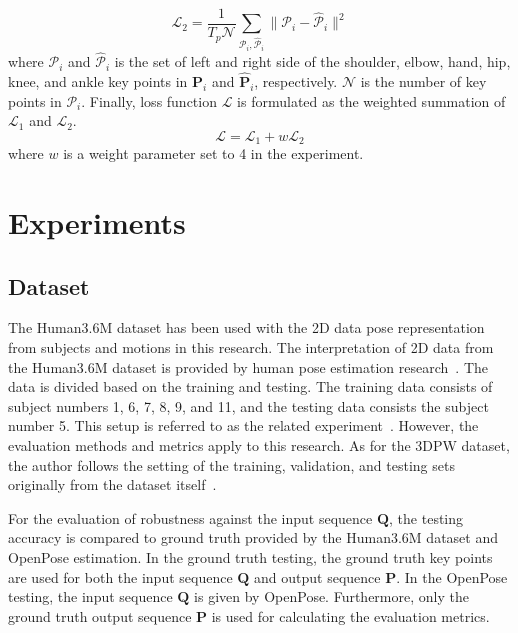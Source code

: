 \begin{equation}
    \label{eq:rmse_add}
    \mathcal{L}_2 =
            \frac{1}{T_p \mathcal{N}}
            \sum_{
                \mathcal{P}_i,
                \mathcal{\hat{P}}_i
            }
            \| \mathcal{P}_i - \mathcal{\hat{P}}_i \|^2
\end{equation}
where $\mathcal{P}_i$ and $\mathcal{\hat{P}}_i$ is the set of left and right side of the shoulder, elbow, hand, hip, knee, and ankle key points in $\mathbf{P}_i$ and $\mathbf{\hat{P}}_i$, respectively.
$\mathcal{N}$ is the number of key points in $\mathcal{P}_i$.
Finally, loss function $\mathcal{L}$ is formulated as the weighted summation of $\mathcal{L}_1$ and $\mathcal{L}_2$.
\begin{equation}
    \mathcal{L} = \mathcal{L}_1 + w \mathcal{L}_2
\end{equation}
where $w$ is a weight parameter set to 4 in the experiment.


\section{Experiments}
\subsection{Dataset}
The Human3.6M dataset has been used with the 2D data pose representation from subjects and motions in this research.
The interpretation of 2D data from the Human3.6M dataset is provided by human pose estimation research~\cite{Zhao2019}.
The data is divided based on the training and testing.
The training data consists of subject numbers 1, 6, 7, 8, 9, and 11, and the testing data consists the subject number 5.
This setup is referred to as the related experiment~\cite{martinez2017}.
However, the evaluation methods and metrics apply to this research. As for the 3DPW dataset, the author follows the setting of the training, validation, and testing sets originally from the dataset itself~\cite{vonMarcard2018}.

For the evaluation of robustness against the input sequence $\mathbf{Q}$,
the testing accuracy is compared to ground truth provided by the Human3.6M dataset and OpenPose estimation.
In the ground truth testing, the ground truth key points are used for both the input sequence $\mathbf{Q}$ and output sequence $\mathbf{P}$.
In the OpenPose testing, the input sequence $\mathbf{Q}$ is given by OpenPose. Furthermore, only the ground truth output sequence $\mathbf{P}$ is used for calculating the evaluation metrics.
